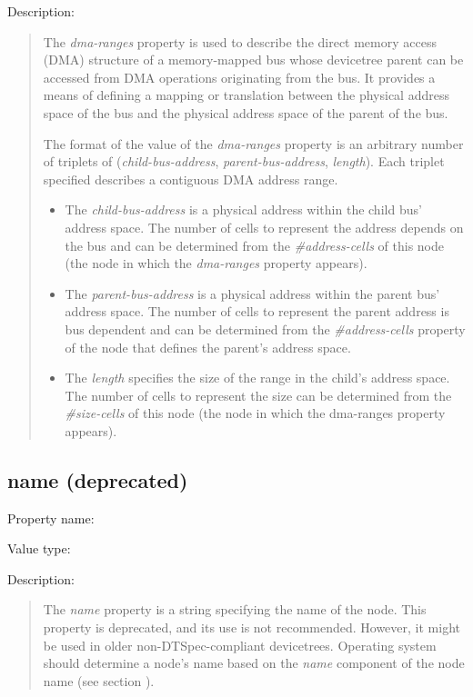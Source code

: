 \documentclass[a4paper,10pt,oneside]{sphinxmanual}
\begin{document}
Description:
\begin{quote}

The \emph{dma-ranges} property is used to describe the direct memory access
(DMA) structure of a memory-mapped bus whose devicetree parent can be
accessed from DMA operations originating from the bus. It provides a
means of defining a mapping or translation between the physical address
space of the bus and the physical address space of the parent of the
bus.

The format of the value of the \emph{dma-ranges} property is an arbitrary
number of triplets of (\emph{child-bus-address}, \emph{parent-bus-address},
\emph{length}). Each triplet specified describes a contiguous DMA address
range.
\begin{itemize}
\item {} 
The \emph{child-bus-address} is a physical address within the child bus'
address space. The number of cells to represent the address depends
on the bus and can be determined from the \emph{\#address-cells} of this
node (the node in which the \emph{dma-ranges} property appears).

\item {} 
The \emph{parent-bus-address} is a physical address within the parent bus'
address space. The number of cells to represent the parent address is
bus dependent and can be determined from the \emph{\#address-cells}
property of the node that defines the parent’s address space.

\item {} 
The \emph{length} specifies the size of the range in the child’s address
space. The number of cells to represent the size can be determined
from the \emph{\#size-cells} of this node (the node in which the dma-ranges
property appears).

\end{itemize}
\end{quote}


\subsection{name (deprecated)}
\label{devicetree-basics:name-deprecated}
Property name: 

Value type: 

Description:
\begin{quote}

The \emph{name} property is a string specifying the name of the node. This
property is deprecated, and its use is not recommended. However, it
might be used in older non-DTSpec-compliant devicetrees. Operating
system should determine a node’s name based on the \emph{name} component of
the node name (see section {\hyperref[devicetree\string-basics:sect\string-node\string-names]{}}).
\end{quote}
\end{document}
